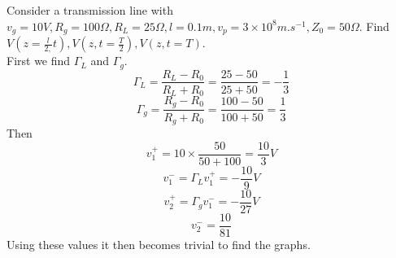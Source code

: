 \documentclass[12pt]{article}
\begin{document}
\begin{ex}
    Consider a transmission line with $v_g = 10\unit{V}, R_g = 100\unit{\Omega}, R_L = 25\unit{\Omega}, l = 0.1\unit{m}, v_p = 3 \times 10^8 \unit{m.s^{-1}}, Z_0 = 50\unit{\Omega}$. Find $V(z = \frac{l}{2,} t), V(z, t = \frac{T}{2}), V(z, t = T)$. \\
    First we find $\Gamma_L$ and $\Gamma_g$.
    $$\Gamma_L = \frac{R_L - R_0}{R_L + R_0} = \frac{25-50}{25+50} = -\frac{1}{3}$$
    $$\Gamma_g = \frac{R_g - R_0}{R_g + R_0} = \frac{100-50}{100+50} = \frac{1}{3}$$
    Then
    $$v_1^+ = 10 \times \frac{50}{50 + 100} = \frac{10}{3}\unit{V}$$
    $$v_1^- = \Gamma_Lv_1^+ = -\frac{10}{9}\unit{V}$$
    $$v_2^+ = \Gamma_gv_1^- = -\frac{10}{27}\unit{V}$$
    $$v_2^- = \frac{10}{81}$$
    Using these values it then becomes trivial to find the graphs.
\end{ex}
\end{document}
